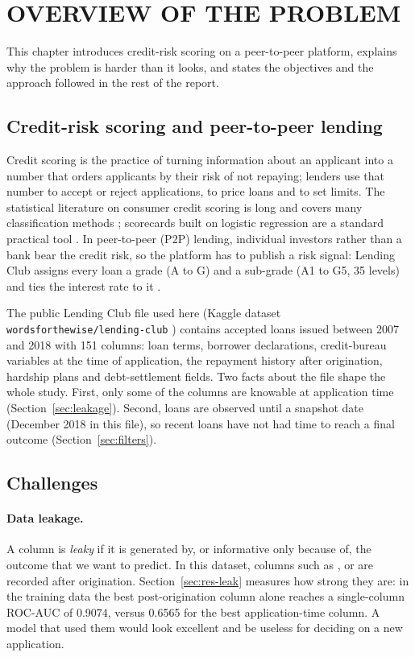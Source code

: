 \section{OVERVIEW OF THE PROBLEM}
\label{ch:overview}

This chapter introduces credit-risk scoring on a peer-to-peer platform, explains why the problem is harder than it looks, and states the objectives and the approach followed in the rest of the report.

\subsection{Credit-risk scoring and peer-to-peer lending}

Credit scoring is the practice of turning information about an applicant into a number that orders applicants by their risk of not repaying; lenders use that number to accept or reject applications, to price loans and to set limits. The statistical literature on consumer credit scoring is long and covers many classification methods \cite{hand1997}; scorecards built on logistic regression are a standard practical tool \cite{siddiqi2017}. In peer-to-peer (P2P) lending, individual investors rather than a bank bear the credit risk, so the platform has to publish a risk signal: Lending Club assigns every loan a grade (A to G) and a sub-grade (A1 to G5, 35 levels) and ties the interest rate to it \cite{serrano2015}.

The public Lending Club file used here (Kaggle dataset \texttt{wordsforthewise/lending-club} \cite{kaggle_lc}) contains accepted loans issued between 2007 and 2018 with 151 columns: loan terms, borrower declarations, credit-bureau variables at the time of application, the repayment history after origination, hardship plans and debt-settlement fields. Two facts about the file shape the whole study. First, only some of the columns are knowable at application time (Section~\ref{sec:leakage}). Second, loans are observed until a snapshot date (December 2018 in this file), so recent loans have not had time to reach a final outcome (Section~\ref{sec:filters}).

\subsection{Challenges}

\paragraph{Data leakage.} A column is \emph{leaky} if it is generated by, or informative only because of, the outcome that we want to predict. In this dataset, columns such as ,  or  are recorded after origination. Section~\ref{sec:res-leak} measures how strong they are: in the training data the best post-origination column alone reaches a single-column ROC-AUC of 0.9074, versus 0.6565 for the best application-time column. A model that used them would look excellent and be useless for deciding on a new application.

